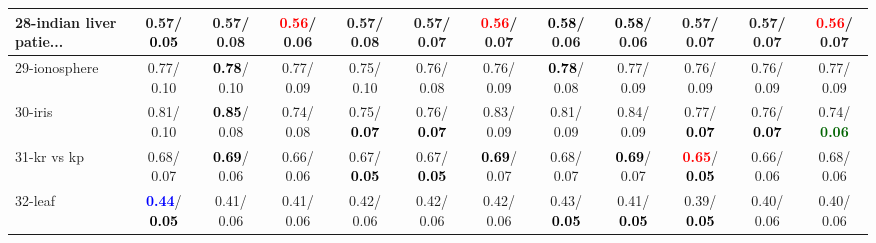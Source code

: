 \begin{table}[h]
\begin{center}
{\begin{tabular}{lc|c|c|c|c|c|c|c|c|c|c}
28-indian liver patie... &   0.57/\textcolor{black}{\textbf{  0.05}} &   0.57/  0.08 & \textcolor{red}{\textbf{  0.56}}/  0.06 &   0.57/  0.08 &   0.57/  0.07 & \textcolor{red}{\textbf{  0.56}}/  0.07 & \textcolor{black}{\textbf{  0.58}}/  0.06 & \textcolor{black}{\textbf{  0.58}}/  0.06 &   0.57/  0.07 &   0.57/  0.07 & \textcolor{red}{\textbf{  0.56}}/  0.07 \\ \hline
29-ionosphere &   0.77/  0.10 & \textcolor{black}{\textbf{  0.78}}/  0.10 &   0.77/  0.09 &   0.75/  0.10 &   0.76/  0.08 &   0.76/  0.09 & \textcolor{black}{\textbf{  0.78}}/  0.08 &   0.77/  0.09 &   0.76/  0.09 &   0.76/  0.09 &   0.77/  0.09 \\
30-iris &   0.81/  0.10 & \textcolor{black}{\textbf{  0.85}}/  0.08 &   0.74/  0.08 &   0.75/\textcolor{black}{\textbf{  0.07}} &   0.76/\textcolor{black}{\textbf{  0.07}} &   0.83/  0.09 &   0.81/  0.09 &   0.84/  0.09 &   0.77/\textcolor{black}{\textbf{  0.07}} &   0.76/\textcolor{black}{\textbf{  0.07}} &   0.74/\textcolor{darkgreen}{\textbf{  0.06}} \\
31-kr vs kp &   0.68/  0.07 & \textcolor{black}{\textbf{  0.69}}/  0.06 &   0.66/  0.06 &   0.67/\textcolor{black}{\textbf{  0.05}} &   0.67/\textcolor{black}{\textbf{  0.05}} & \textcolor{black}{\textbf{  0.69}}/  0.07 &   0.68/  0.07 & \textcolor{black}{\textbf{  0.69}}/  0.07 & \textcolor{red}{\textbf{  0.65}}/\textcolor{black}{\textbf{  0.05}} &   0.66/  0.06 &   0.68/  0.06 \\
32-leaf & \textcolor{blue}{\textbf{  0.44}}/\textcolor{black}{\textbf{  0.05}} &   0.41/  0.06 &   0.41/  0.06 &   0.42/  0.06 &   0.42/  0.06 &   0.42/  0.06 &   0.43/\textcolor{black}{\textbf{  0.05}} &   0.41/\textcolor{black}{\textbf{  0.05}} &   0.39/\textcolor{black}{\textbf{  0.05}} &   0.40/  0.06 &   0.40/  0.06 \\\end{tabular}}\label{stratsBalAcc0bCIELM}
\end{center}
\end{table}
